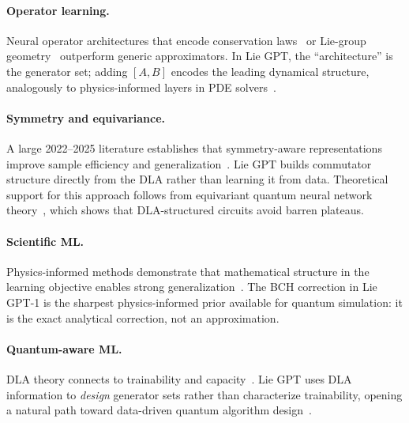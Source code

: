 \documentclass[aps,prxquantum,twocolumn,nofootinbib]{revtex4-2}
\begin{document}
\paragraph{Operator learning.}
Neural operator architectures that encode conservation
laws~\cite{icml_lingschmbpkm24} or Lie-group
geometry~\cite{icml_chenw24,aaai_liuwryhxc025} outperform generic
approximators. In Lie GPT, the ``architecture'' is the generator set;
adding $[A,B]$ encodes the leading dynamical structure, analogously
to physics-informed layers in PDE
solvers~\cite{brandstetter2023iclr,aaai_chen25b,icml_hernandez2023}.

\paragraph{Symmetry and equivariance.}
A large 2022--2025 literature establishes that symmetry-aware
representations improve sample efficiency and
generalization~\cite{liao2023iclr,batatia2023iclr,bronstein2022iclr,
finzi2021iclr,fuchs2020iclr,zitnick2022iclr,lu2022iclr}.
Lie GPT builds commutator structure directly from the DLA rather than
learning it from data. Theoretical support for this approach follows
from equivariant quantum neural network
theory~\cite{nguyen2022,icml_larocca2023,icml_schatzki2024,schatzki2022},
which shows that DLA-structured circuits avoid barren plateaus.

\paragraph{Scientific ML.}
Physics-informed methods demonstrate that mathematical structure in
the learning objective enables strong
generalization~\cite{brandstetter2023iclr,aaai_chen25b,icml_west2023,shaw2020}.
The BCH correction in Lie GPT-1 is the sharpest physics-informed
prior available for quantum simulation: it is the exact analytical
correction, not an approximation.

\paragraph{Quantum-aware ML.}
DLA theory connects to trainability and
capacity~\cite{nguyen2023nips,cerezo2022nips,aaai_leeck25,larocca2023,
dong2023nips,nips_chensrsmm24,nips_ma0lj024,li2023iclr,icml_west2023}.
Lie GPT uses DLA information to \emph{design} generator sets rather
than characterize trainability, opening a natural path toward
data-driven quantum algorithm
design~\cite{haug2024,loschmidt2023prxq}.
\end{document}
